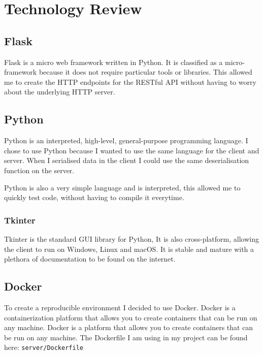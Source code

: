 \chapter{Technology Review}




\section{Flask}
Flask is a micro web framework written in Python.
It is classified as a micro-framework because it does not require particular tools or libraries.
This allowed me to create the HTTP endpoints for the RESTful API without having to worry about the underlying HTTP server.

\section{Python}
Python is an interpreted, high-level, general-purpose programming language.
I chose to use Python because I wanted to use the same language for the client and server.
When I serialised data in the client I could use the same deserialisation function on the server.

Python is also a very simple language and is interpreted, this allowed me to quickly test code, without having to compile it everytime.

\subsection{Tkinter}
Tkinter is the standard GUI library for Python,
It is also cross-platform, allowing the client to run on Windows, Linux and macOS.
It is stable and mature with a plethora of documentation to be found on the internet.

\section{Docker}
To create a reproducible environment I decided to use Docker.
Docker is a containerization platform that allows you to create containers that can be run on any machine.
Docker is a platform that allows you to create containers that can be run on any machine.
The Dockerfile I am using in my project can be found here: \texttt{server/Dockerfile}

